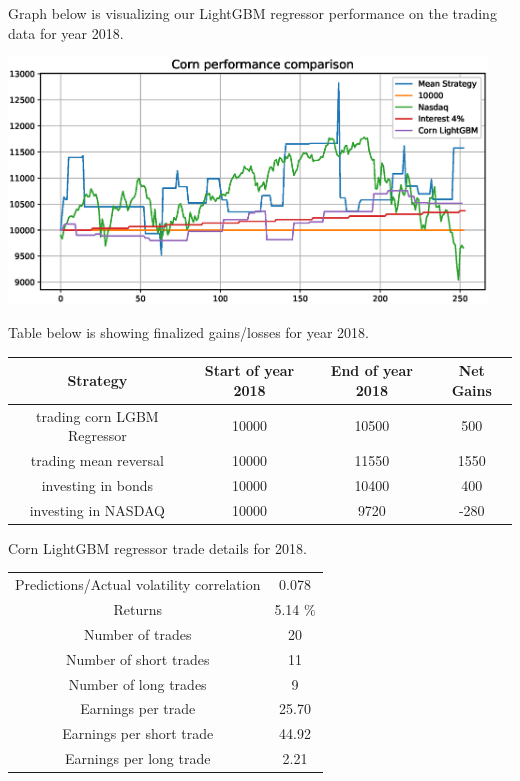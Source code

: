 \documentclass[final,2p]{elsarticle}
\begin{document}
Graph below is visualizing our LightGBM regressor performance on the trading data for year 2018.

\begin{center}
\includegraphics[width = 5in]{figures/corn_benchmark_performance.eps}
\end{center}

Table below is showing finalized gains/losses for year 2018.

\begin{center}
    \begin{tabular}{cccc}
        Strategy & Start of year 2018 & End of year 2018 & Net Gains \\
        \hline
        trading corn LGBM Regressor & 10000 & 10500 & 500 \\
        trading mean reversal & 10000 & 11550 & 1550 \\
        investing in bonds & 10000 & 10400 & 400 \\
        investing in NASDAQ & 10000 & 9720 & -280 \\
    \end{tabular}
\end{center}

Corn LightGBM regressor trade details for 2018.
\begin{center}
    \begin{tabular}{c|c}
        Predictions/Actual volatility correlation & 0.078\\
        Returns & 5.14 \%\\
        Number of trades & 20\\
        Number of short trades & 11\\
        Number of long trades & 9\\
        Earnings per trade & 25.70\\
        Earnings per short trade & 44.92\\
        Earnings per long trade & 2.21\\
    \end{tabular}
\end{center}
\end{document}
